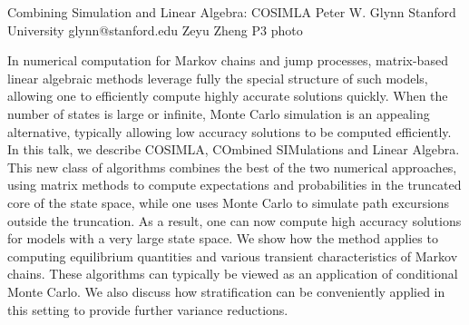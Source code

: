 \clearpage

\begin{talk}
  {Combining Simulation and Linear Algebra: COSIMLA}%
  {Peter W. Glynn}%
  {Stanford University}%
  {glynn@stanford.edu}%
  {Zeyu Zheng}%
  {}%
  {}%
  {P3}%
  {photo}%
			
In numerical computation for Markov chains and jump processes, matrix-based linear algebraic methods leverage fully the special structure of such models, allowing one to efficiently compute highly accurate solutions quickly. When the number of states is large or infinite, Monte Carlo simulation is an appealing alternative, typically allowing low accuracy solutions to be computed efficiently. In this talk, we describe COSIMLA, COmbined SIMulations and Linear Algebra. This new class of algorithms combines the best of the two numerical approaches, using matrix methods to compute expectations and probabilities in the truncated core of the state space, while one uses Monte Carlo to simulate path excursions outside the truncation. As a result, one can now compute high accuracy solutions for models with a very large state space. We show how the method applies to computing equilibrium quantities and various transient characteristics of Markov chains. These algorithms can typically be viewed as an application of conditional Monte Carlo. We also discuss how stratification can be conveniently applied in this setting to provide further variance reductions.  

\end{talk}

\clearpage

